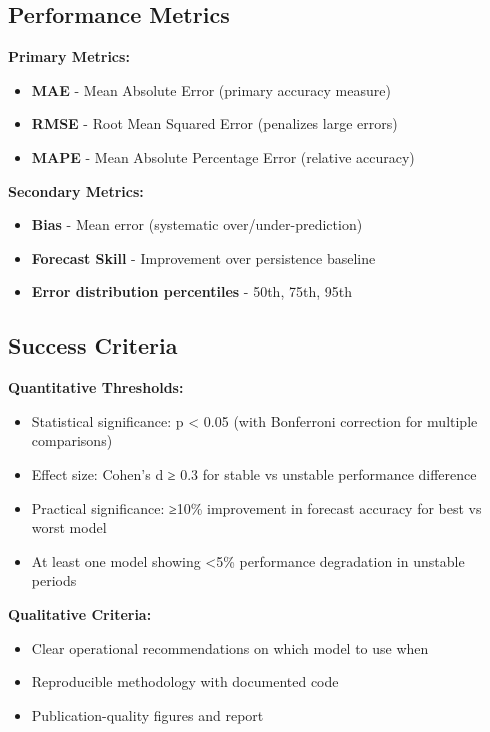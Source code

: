 \documentclass[11pt,a4paper]{article}
\begin{document}
\subsection{Performance Metrics}

\textbf{Primary Metrics:}
\begin{itemize}
    \item \textbf{MAE} - Mean Absolute Error (primary accuracy measure)
    \item \textbf{RMSE} - Root Mean Squared Error (penalizes large errors)
    \item \textbf{MAPE} - Mean Absolute Percentage Error (relative accuracy)
\end{itemize}

\textbf{Secondary Metrics:}
\begin{itemize}
    \item \textbf{Bias} - Mean error (systematic over/under-prediction)
    \item \textbf{Forecast Skill} - Improvement over persistence baseline
    \item \textbf{Error distribution percentiles} - 50th, 75th, 95th
\end{itemize}

\subsection{Success Criteria}

\textbf{Quantitative Thresholds:}
\begin{itemize}
    \item Statistical significance: p < 0.05 (with Bonferroni correction for multiple comparisons)
    \item Effect size: Cohen's d ≥ 0.3 for stable vs unstable performance difference
    \item Practical significance: ≥10\% improvement in forecast accuracy for best vs worst model
    \item At least one model showing <5\% performance degradation in unstable periods
\end{itemize}

\textbf{Qualitative Criteria:}
\begin{itemize}
    \item Clear operational recommendations on which model to use when
    \item Reproducible methodology with documented code
    \item Publication-quality figures and report
\end{itemize}
\end{document}
